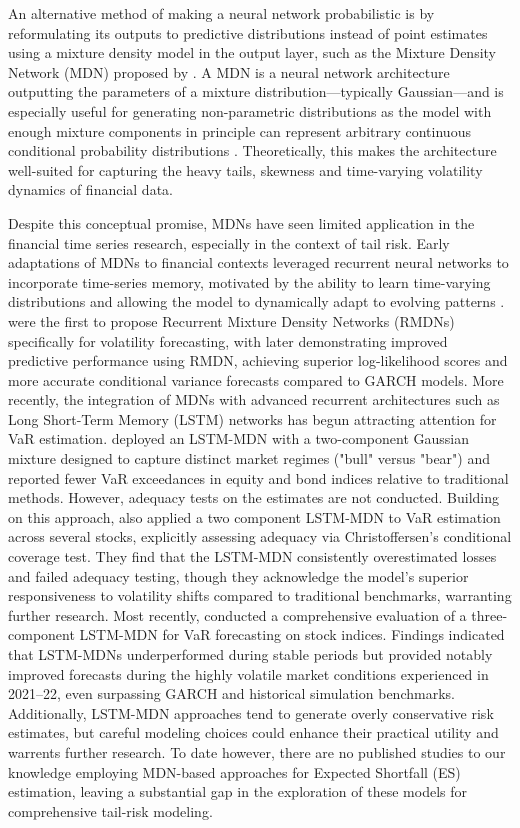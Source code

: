 An alternative method of making a neural network probabilistic is by reformulating its outputs to predictive distributions instead of point estimates using a mixture density model in the output layer, such as the Mixture Density Network (MDN) proposed by \textcite{bishop1994mdn}. A MDN is a neural network architecture outputting the parameters of a mixture distribution—typically Gaussian—and is especially useful for generating non-parametric distributions as the model with enough mixture components in principle can represent arbitrary continuous conditional probability distributions \parencite{bishop1994mdn}. Theoretically, this makes the architecture well-suited for capturing the heavy tails, skewness and time-varying volatility dynamics of financial data. 

Despite this conceptual promise, MDNs have seen limited application in the financial time series research, especially in the context of tail risk. Early adaptations of MDNs to financial contexts leveraged recurrent neural networks to incorporate time-series memory, motivated by the ability to learn time-varying distributions and allowing the model to dynamically adapt to evolving patterns \parencite{Nikolaev2013}. \textcite{Schittenkopf2000} were the first to propose Recurrent Mixture Density Networks (RMDNs) specifically for volatility forecasting, with \textcite{Nikolaev2013} later demonstrating improved predictive performance using RMDN, achieving superior log-likelihood scores and more accurate conditional variance forecasts compared to GARCH models. More recently, the integration of MDNs with advanced recurrent architectures such as Long Short-Term Memory (LSTM) networks has begun attracting attention for VaR estimation. \textcite{arimond2020} deployed an LSTM-MDN with a two-component Gaussian mixture designed to capture distinct market regimes ("bull" versus "bear") and reported fewer VaR exceedances in equity and bond indices relative to traditional methods. However, adequacy tests on the estimates are not conducted. Building on this approach, \textcite{karlsson2021value} also applied a two component LSTM-MDN to VaR estimation across several stocks, explicitly assessing adequacy via Christoffersen’s conditional coverage test. They find that the LSTM-MDN consistently overestimated losses and failed adequacy testing, though they acknowledge the model’s superior responsiveness to volatility shifts compared to traditional benchmarks, warranting further research.  Most recently, \textcite{herrig} conducted a comprehensive evaluation of a three-component LSTM-MDN for VaR forecasting on stock indices. Findings indicated that LSTM-MDNs underperformed during stable periods but provided notably improved forecasts during the highly volatile market conditions experienced in 2021–22, even surpassing GARCH and historical simulation benchmarks. Additionally, LSTM-MDN approaches tend to generate overly conservative risk estimates, but careful modeling choices could enhance their practical utility and warrents further research. To date however, there are no published studies to our knowledge employing MDN-based approaches for Expected Shortfall (ES) estimation, leaving a substantial gap in the exploration of these models for comprehensive tail-risk modeling.

